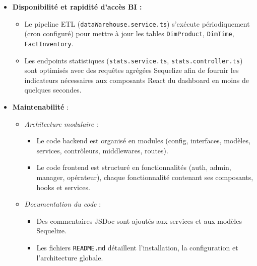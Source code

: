 \documentclass[12pt,a4paper]{report}
\begin{document}
\begin{itemize}
  \item \textbf{Disponibilité et rapidité d’accès BI :}  
    \begin{itemize}
      \item Le pipeline ETL (\texttt{dataWarehouse.service.ts}) s’exécute périodiquement (cron configuré) pour mettre à jour les tables \texttt{DimProduct}, \texttt{DimTime}, \texttt{FactInventory}.  
      \item Les endpoints statistiques (\texttt{stats.service.ts}, \texttt{stats.controller.ts}) sont optimisés avec des requêtes agrégées Sequelize afin de fournir les indicateurs nécessaires aux composants React du dashboard en moins de quelques secondes.
    \end{itemize}

    \item \textbf{Maintenabilité} :  
    \begin{itemize}
      \item \emph{Architecture modulaire} :  
        \begin{itemize}
          \item Le code backend est organisé en modules (config, interfaces, modèles, services, contrôleurs, middlewares, routes).  
          \item Le code frontend est structuré en fonctionnalités (auth, admin, manager, opérateur), chaque fonctionnalité contenant ses composants, hooks et services.  
        \end{itemize}
      \item \emph{Documentation du code} :  
        \begin{itemize}
          \item Des commentaires JSDoc sont ajoutés aux services et aux modèles Sequelize.  
          \item Les fichiers \texttt{README.md} détaillent l’installation, la configuration et l’architecture globale.  
        \end{itemize}
    \end{itemize}


\end{itemize}
\end{document}
